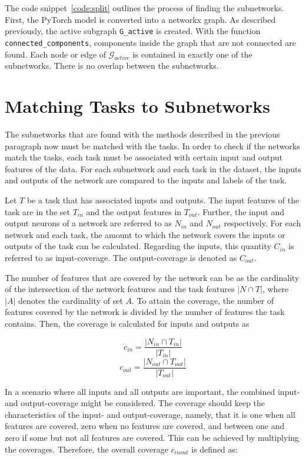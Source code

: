 The code snippet~\ref{code:split} outlines the process of finding the subnetworks.
First, the PyTorch model is converted into a networkx graph.
As described previously, the active subgraph \lstinline{G_active} is created.
With the function \lstinline{connected_components}, components inside the graph that are not connected are found.
Each node or edge of $\mathcal{G}_{active}$ is contained in exactly one of the subnetworks.
There is no overlap between the subnetworks.



\section{Matching Tasks to Subnetworks}\label{sec:taskmatch}


The subnetworks that are found with the methods described in the previous paragraph now must be matched with the tasks.
In order to check if the networks match the tasks, each task must be associated with certain input and output features of the data.
For each subnetwork and each task in the dataset, the inputs and outputs of the network are compared to the inputs and labels of the task.

Let $T$ be a task that has associated inputs and outputs.
The input features of the task are in the set $T_{in}$ and the output features in $T_{out}$.
Further, the input and output neurons of a network are referred to as $N_{in}$ and $N_{out}$ respectively.
For each network and each task, the amount to which the network covers the inputs or outputs of the task can be calculated.
Regarding the inputs, this quantity $C_{in}$ is referred to as input-coverage. The output-coverage is denoted as $C_{out}$.

The number of features that are covered by the network can be as the cardinality of the intersection of the network features and the task features $ |N \cap T|$, where  $|A|$ denotes the cardinality of set $A$.
To attain the coverage, the number of features covered by the network is divided by the number of features the task contains.
Then, the coverage is calculated for inputs and outputs as 

\[
c_{in} = \frac{|N_{in}  \cap T_{in} |}{|T_{in} |}
\]
\[
c_{out} = \frac{|N_{out}  \cap T_{out} |}{|T_{out}|}
\]

In a scenario where all inputs and all outputs are important, the combined input- and output-coverage might be considered.
The coverage should keep the characteristics of the input- and output-coverage, namely, that it is one when all features are covered, zero when no features are covered, and between one and zero if some but not all features are covered.
This can be achieved by multiplying the coverages.
Therefore, the overall coverage $c_{inout}$ is defined as:

